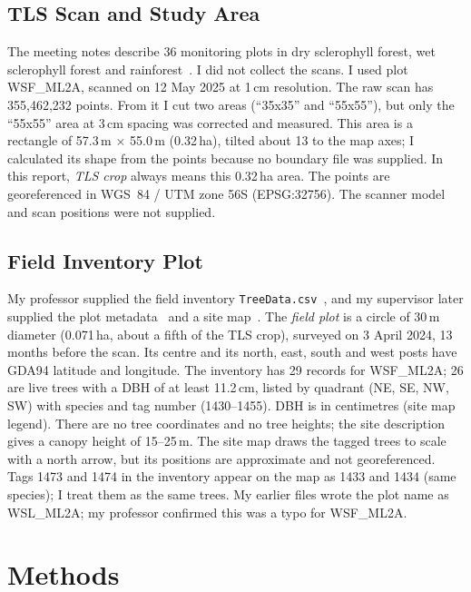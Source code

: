 \documentclass[runningheads]{llncs}
\begin{document}
\subsection{TLS Scan and Study Area}\label{sec:tls}
The meeting notes describe 36 monitoring plots in dry sclerophyll forest, wet sclerophyll forest and rainforest~\cite{meetingnotes}. I did not collect the scans. I used plot WSF\_ML2A, scanned on 12 May 2025 at 1\,cm resolution. The raw scan has 355,462,232 points. From it I cut two areas (``35x35'' and ``55x55''), but only the ``55x55'' area at 3\,cm spacing was corrected and measured. This area is a rectangle of 57.3\,m $\times$ 55.0\,m (0.32\,ha), tilted about 13\textdegree{} to the map axes; I calculated its shape from the points because no boundary file was supplied. In this report, \emph{TLS crop} always means this 0.32\,ha area. The points are georeferenced in WGS~84 / UTM zone 56S (EPSG:32756). The scanner model and scan positions were not supplied.

\subsection{Field Inventory Plot}\label{sec:field}
My professor supplied the field inventory \texttt{TreeData.csv}~\cite{treedata}, and my supervisor later supplied the plot metadata~\cite{plotdata} and a site map~\cite{sitemap}. The \emph{field plot} is a circle of 30\,m diameter (0.071\,ha, about a fifth of the TLS crop), surveyed on 3 April 2024, 13 months before the scan. Its centre and its north, east, south and west posts have GDA94 latitude and longitude. The inventory has 29 records for WSF\_ML2A; 26 are live trees with a DBH of at least 11.2\,cm, listed by quadrant (NE, SE, NW, SW) with species and tag number (1430--1455). DBH is in centimetres (site map legend). There are no tree coordinates and no tree heights; the site description gives a canopy height of 15--25\,m. The site map draws the tagged trees to scale with a north arrow, but its positions are approximate and not georeferenced. Tags 1473 and 1474 in the inventory appear on the map as 1433 and 1434 (same species); I treat them as the same trees. My earlier files wrote the plot name as WSL\_ML2A; my professor confirmed this was a typo for WSF\_ML2A.

\section{Methods}\label{sec:method}
\end{document}
